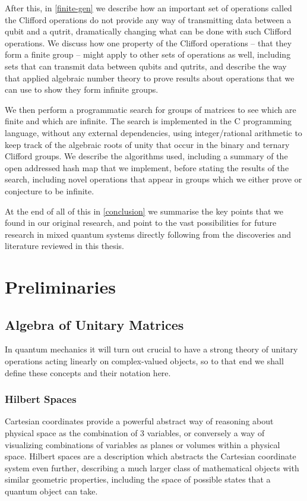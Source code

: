 After this, in \autoref{finite-gen} we describe how an important set of operations called the Clifford operations do not provide any way of transmitting data between a qubit and a qutrit, dramatically changing what can be done with such Clifford operations. We discuss how one property of the Clifford operations -- that they form a finite group -- might apply to other sets of operations as well, including sets that can transmit data between qubits and qutrits, and describe the way that \cite{universal-qubit} applied algebraic number theory to prove results about operations that we can use to show they form infinite groups.

We then perform a programmatic search for groups of matrices to see which are finite and which are infinite. The search is implemented in the C programming language, without any external dependencies, using integer/rational arithmetic to keep track of the algebraic roots of unity that occur in the binary and ternary Clifford groups. We describe the algorithms used, including a summary of the open addressed hash map that we implement, before stating the results of the search, including novel operations that appear in groups which we either prove or conjecture to be infinite.

At the end of all of this in \autoref{conclusion} we summarise the key points that we found in our original research, and point to the vast possibilities for future research in mixed quantum systems directly following from the discoveries and literature reviewed in this thesis.

\chapter[PRELIMINARIES]{Preliminaries}\label{preliminaries}
\section{Algebra of Unitary Matrices}
In quantum mechanics it will turn out crucial to have a strong theory of unitary operations acting linearly on complex-valued objects, so to that end we shall define these concepts and their notation here.
\subsection{Hilbert Spaces}
Cartesian coordinates provide a powerful abstract way of reasoning about physical space as the combination of 3 variables, or conversely a way of visualizing combinations of variables as planes or volumes within a physical space. Hilbert spaces are a description which abstracts the Cartesian coordinate system even further, describing a much larger class of mathematical objects with similar geometric properties, including the space of possible states that a quantum object can take.

